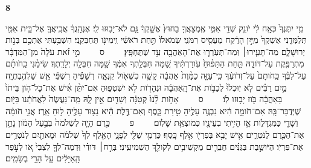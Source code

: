 \documentclass[a4paper]{article}
\newif\iflargetext
\newcommand{\rdrchap}[1]{\begin{english}\setRL\small\textbf{#1}\end{english}}
\newcommand{\rdrverse}[1]{\raisebox{2.5pt}{\smaller[4]#1}}
\newcommand{\setuma}{~~~~{\scriptsize ס}~~~~}
\newcommand{\petucha}{~~~~{\footnotesize פ}~~~~}
\begin{document}
\begin{hebrew}
\begin{multicols}{2}
\rdrchap{8}\rdrverse{1} מִ֤י יִתֶּנְךָ֙ כְּאָ֣ח לִ֔י יֹונֵ֖ק שְׁדֵ֣י אִמִּ֑י אֶֽמְצָאֲךָ֤ בַחוּץ֙ אֶשָּׁ֣קְךָ֔ גַּ֖ם לֹא־יָב֥וּזוּ לִֽי׃ 
\rdrverse{2} אֶנְהָֽגֲךָ֗ אֲבִֽיאֲךָ֛ אֶל־בֵּ֥ית אִמִּ֖י תְּלַמְּדֵ֑נִי אַשְׁקְךָ֙ מִיַּ֣יִן הָרֶ֔קַח מֵעֲסִ֖יס רִמֹּנִֽי׃ 
\rdrverse{3} שְׂמֹאלֹו֙ תַּ֣חַת רֹאשִׁ֔י וִֽימִינֹ֖ו תְּחַבְּקֵֽנִי׃ 
\rdrverse{4} הִשְׁבַּ֥עְתִּי אֶתְכֶ֖ם בְּנֹ֣ות יְרוּשָׁלִָ֑ם מַה־תָּעִ֧ירוּ׀ וּֽמַה־תְּעֹֽרְר֛וּ אֶת־הָאַהֲבָ֖ה עַ֥ד שֶׁתֶּחְפָּֽץ׃ \setuma{} 
\rdrverse{5} מִ֣י זֹ֗את עֹלָה֙ מִן־הַמִּדְבָּ֔ר מִתְרַפֶּ֖קֶת עַל־דֹּודָ֑הּ תַּ֤חַת הַתַּפּ֨וּחַ֙ עֹֽורַרְתִּ֔יךָ שָׁ֚מָּה חִבְּלַ֣תְךָ אִמֶּ֔ךָ שָׁ֖מָּה חִבְּלָ֥ה יְלָדַֽתְךָ׃ 
\rdrverse{6} שִׂימֵ֨נִי כַֽחֹותָ֜ם עַל־לִבֶּ֗ךָ כַּֽחֹותָם֙ עַל־זְרֹועֶ֔ךָ כִּֽי־עַזָּ֤ה כַמָּ֨וֶת֙ אַהֲבָ֔ה קָשָׁ֥ה כִשְׁאֹ֖ול קִנְאָ֑ה רְשָׁפֶ֕יהָ רִשְׁפֵּ֕י אֵ֖שׁ שַׁלְהֶ֥בֶתְיָֽה׃ 
\rdrverse{7} מַ֣יִם רַבִּ֗ים לֹ֤א יֽוּכְלוּ֙ לְכַבֹּ֣ות אֶת־הָֽאַהֲבָ֔ה וּנְהָרֹ֖ות לֹ֣א יִשְׁטְפ֑וּהָ אִם־יִתֵּ֨ן אִ֜ישׁ אֶת־כָּל־הֹ֤ון בֵּיתֹו֙ בָּאַהֲבָ֔ה בֹּ֖וז יָב֥וּזוּ לֹֽו׃ \setuma{} 
\rdrverse{8} אָחֹ֥ות לָ֨נוּ֙ קְטַנָּ֔ה וְשָׁדַ֖יִם אֵ֣ין לָ֑הּ מַֽה־נַּעֲשֶׂה֙ לַאֲחֹתֵ֔נוּ בַּיֹּ֖ום שֶׁיְּדֻבַּר־בָּֽהּ׃ 
\rdrverse{9} אִם־חֹומָ֣ה הִ֔יא נִבְנֶ֥ה עָלֶ֖יהָ טִ֣ירַת כָּ֑סֶף וְאִם־דֶּ֣לֶת הִ֔יא נָצ֥וּר עָלֶ֖יהָ ל֥וּחַ אָֽרֶז׃ 
\rdrverse{10} אֲנִ֣י חֹומָ֔ה וְשָׁדַ֖י כַּמִּגְדָּלֹ֑ות אָ֛ז הָיִ֥יתִי בְעֵינָ֖יו כְּמֹוצְאֵ֥ת שָׁלֹֽום׃ \petucha{} 
\rdrverse{11} כֶּ֣רֶם הָיָ֤ה לִשְׁלֹמֹה֙ בְּבַ֣עַל הָמֹ֔ון נָתַ֥ן אֶת־הַכֶּ֖רֶם לַנֹּטְרִ֑ים אִ֛ישׁ יָבִ֥א בְּפִרְיֹ֖ו אֶ֥לֶף כָּֽסֶף׃ 
\rdrverse{12} כַּרְמִ֥י שֶׁלִּ֖י לְפָנָ֑י הָאֶ֤לֶף לְךָ֙ שְׁלֹמֹ֔ה וּמָאתַ֖יִם לְנֹטְרִ֥ים אֶת־פִּרְיֹֽו׃ 
\rdrverse{13} הַיֹּושֶׁ֣בֶת בַּגַּנִּ֗ים חֲבֵרִ֛ים מַקְשִׁיבִ֥ים לְקֹולֵ֖ךְ הַשְׁמִיעִֽינִי׃ 
\rdrverse{14} בְּרַ֣ח׀ דֹּודִ֗י וּֽדְמֵה־לְךָ֤ לִצְבִי֙ אֹ֚ו לְעֹ֣פֶר הָֽאַיָּלִ֔ים עַ֖ל הָרֵ֥י בְשָׂמִֽים׃ 
\iflargetext\else\end{multicols}\fi
\end{hebrew}


\end{document}
